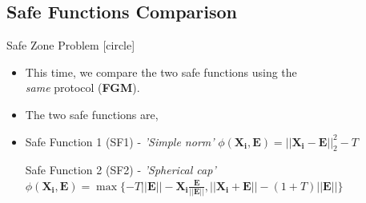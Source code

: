 \subsection{Safe Functions Comparison}\label{subsec:safe-functions-comparison}

\begin{frame}{Safe Zone Problem}
    [circle]
    \begin{itemize}
        \item{This time, we compare the two safe functions using the\\ \emph{same} protocol (\textbf{FGM}).}
        \item{The two safe functions are,}
        \vspace{0.2cm}
        \item[]{
        \begin{block}{Safe Function 1 (SF1) - \emph{'Simple norm'}}
            $\phi(\pmb{X_i},\pmb{E}) = ||\pmb{X_i}-\pmb{E}||_2^2 - T$
        \end{block}}
        \vspace{0.3cm}
        \begin{block}{Safe Function 2 (SF2) - \emph{'Spherical cap'}}
            $\phi(\pmb{X_i},\pmb{E}) = \max\{-T||\pmb{E}|| - \pmb{X_i}\frac{\pmb{E}}{\pmb{||E||}}, ||\pmb{X_i}+\pmb{E}|| - (1+T)||\pmb{E}||\}$
        \end{block}
    \end{itemize}
\end{frame}

